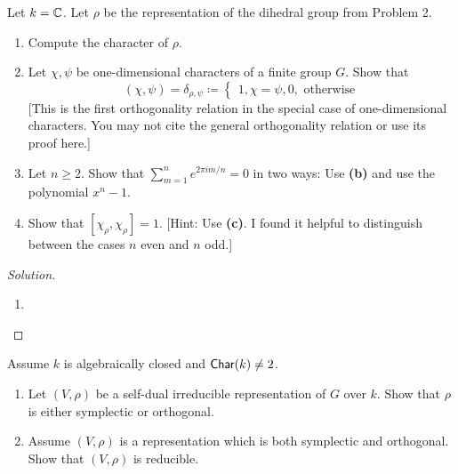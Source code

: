 \begin{problem}
Let $k = \mathbb{C}$. Let $\rho$ be the representation of the dihedral group from Problem 2. 

\begin{enumerate}[font=\normalfont,label=\textbf{(\alph*)}]
\item Compute the character of $\rho$. 

\item Let $\chi, \psi$ be one-dimensional characters of a finite group $G$. Show that 
\[
(\chi, \psi) = \delta_{\rho, \psi} \coloneqq 
\begin{cases}
1, \chi = \psi, 
0, \text{ otherwise}
\end{cases}
\]
[This is the first orthogonality relation in the special case of one-dimensional characters. You may not cite the general orthogonality relation or use its proof here.]
\item Let $n \geq 2$. Show that $\sum_{m=1}^n e^{2\pi im/n} = 0$ in two ways: Use \textbf{(b)} and use the polynomial $x^n-1$. 
\item Show that $[\chi_\rho, \chi_\rho] = 1$. [Hint: Use \textbf{(c)}. I found it helpful to distinguish between the cases $n$ even and $n$ odd.]
\end{enumerate}
\end{problem}

\begin{proof}[Solution]
\hfill
\begin{enumerate}[font=\normalfont,label=\textbf{(\alph*)}, wide]
\item
\end{enumerate}
\end{proof}

\newpage


\begin{problem}
Assume $k$ is algebraically closed and $\mathsf{Char}(k) \neq 2$. 

\begin{enumerate}[font=\normalfont,label=\textbf{(\alph*)}]
\item Let $(V, \rho)$ be a self-dual irreducible representation of $G$ over $k$. Show that $\rho$ is either symplectic or orthogonal.

\item Assume $(V, \rho)$ is a representation which is both symplectic and orthogonal. Show that $(V, \rho)$ is reducible. 

\end{enumerate}
\end{problem}

